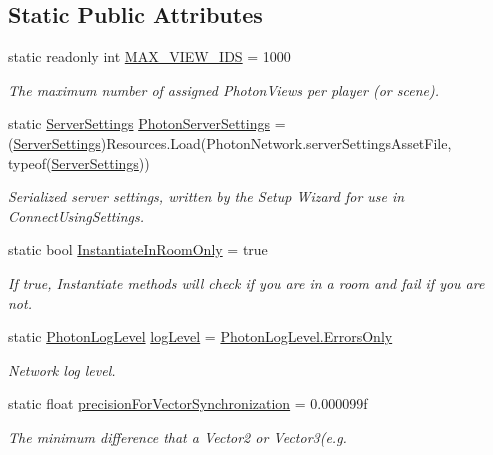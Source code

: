 \subsection*{Static Public Attributes}
\begin{DoxyCompactItemize}
\item 
static readonly int \hyperlink{class_photon_network_ad3b82aa2ac8d89db5ebf0bc5ac9add9e}{M\+A\+X\+\_\+\+V\+I\+E\+W\+\_\+\+I\+DS} = 1000
\begin{DoxyCompactList}\small\item\em The maximum number of assigned Photon\+Views {\itshape per player} (or scene). \end{DoxyCompactList}\item 
static \hyperlink{class_server_settings}{Server\+Settings} \hyperlink{class_photon_network_a505f06c3eb4ca67db5dd517aab34143d}{Photon\+Server\+Settings} = (\hyperlink{class_server_settings}{Server\+Settings})Resources.\+Load(Photon\+Network.\+server\+Settings\+Asset\+File, typeof(\hyperlink{class_server_settings}{Server\+Settings}))
\begin{DoxyCompactList}\small\item\em Serialized server settings, written by the Setup Wizard for use in Connect\+Using\+Settings.\end{DoxyCompactList}\item 
static bool \hyperlink{class_photon_network_ae0036d259f2b793b4838393837d4cf6d}{Instantiate\+In\+Room\+Only} = true
\begin{DoxyCompactList}\small\item\em If true, Instantiate methods will check if you are in a room and fail if you are not. \end{DoxyCompactList}\item 
static \hyperlink{group__public_api_gaf0468f6a0c8ab8caec09678e6dc6f3d5}{Photon\+Log\+Level} \hyperlink{class_photon_network_aa7c0c32ec0a25f37438436f10c5bde59}{log\+Level} = \hyperlink{group__public_api_ggaf0468f6a0c8ab8caec09678e6dc6f3d5ae0a1284706116eec7a83a489235a9ef8}{Photon\+Log\+Level.\+Errors\+Only}
\begin{DoxyCompactList}\small\item\em Network log level. \end{DoxyCompactList}\item 
static float \hyperlink{class_photon_network_acff20b8fd3871e0b3be350e0d1c98605}{precision\+For\+Vector\+Synchronization} = 0.\+000099f
\begin{DoxyCompactList}\small\item\em The minimum difference that a Vector2 or Vector3(e.\+g. \end{DoxyCompactList}\item 

\end{DoxyCompactItemize}
